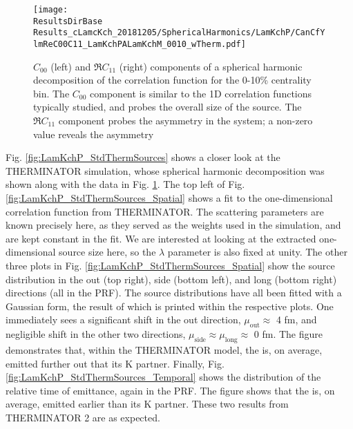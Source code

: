 \documentclass[/home/jesse/Analysis/FemtoAnalysis/AnalysisNotes/AnalysisNoteJBuxton.tex]{subfiles}
\begin{document}
\begin{figure}[h!]
  \centering
  \texttt{[image: \\ResultsDirBase Results\_cLamcKch\_20181205/SphericalHarmonics/LamKchP/CanCfYlmReC00C11\_LamKchPALamKchM\_0010\_wTherm.pdf]}
  \caption[\LamKchP $C_{00}$ and $\Re C_{11}$ spherical harmonic components (0-10\%)]{$C_{00}$ (left) and $\Re C_{11}$ (right) components of a spherical harmonic decomposition of the \LamKchP correlation function for the 0-10\% centrality bin.  
The $C_{00}$ component is similar to the 1D correlation functions typically studied, and probes the overall size of the source.
The $\Re C_{11}$ component probes the asymmetry in the system; a non-zero value reveals the asymmetry}
  \label{fig:LamKchP_ReC00C11_0010}
\end{figure}


Fig. \ref{fig:LamKchP_StdThermSources} shows a closer look at the THERMINATOR simulation, whose spherical harmonic decomposition was shown along with the data in Fig. \ref{fig:LamKchP_ReC00C11_0010}.
The top left of Fig. \ref{fig:LamKchP_StdThermSources_Spatial} shows a fit to the one-dimensional correlation function from THERMINATOR.
The scattering parameters are known precisely here, as they served as the weights used in the simulation, and are kept constant in the fit.
We are interested at looking at the extracted one-dimensional source size here, so the $\lambda$ parameter is also fixed at unity.
The other three plots in Fig. \ref{fig:LamKchP_StdThermSources_Spatial} show the source distribution in the out (top right), side (bottom left), and long (bottom right) directions (all in the PRF).
The source distributions have all been fitted with a Gaussian form, the result of which is printed within the respective plots.
One immediately sees a significant shift in the out direction, $\mu_{\mathrm{out}} \approx$ 4 fm, and negligible shift in the other two directions, $\mu_{\mathrm{side}} \approx \mu_{\mathrm{long}} \approx$ 0 fm.
The figure demonstrates that, within the THERMINATOR model, the \Lam is, on average, emitted further out that its K partner.
Finally, Fig. \ref{fig:LamKchP_StdThermSources_Temporal} shows the distribution of the relative time of emittance, again in the PRF.
The figure shows that the \Lam is, on average, emitted earlier than its K partner.
These two results from THERMINATOR 2 are as expected.
\end{document}
